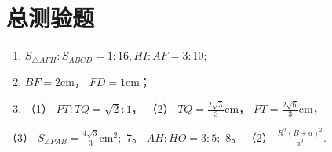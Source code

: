 \section{总测验题}

\begin{enumerate}
\item
  \(S_{\triangle AFH}: S_{ABCD} = 1:16, HI: AF = 3:10;\)
\item
  \(BF = 2\mathrm{cm}\)， \(FD = 1\mathrm{cm}\)；
\item
  （1） \(PT: TQ = \sqrt{2}: 1\)， （2）
  \(TQ = \frac{2\sqrt{3}}{3}\mathrm{cm}\)，
  \(PT = \frac{2\sqrt{6}}{3}\mathrm{cm}\)，
\end{enumerate}

（3） \(S_{\angle PAB} = \frac{4\sqrt{3}}{3}\mathrm{cm}^2;\) 7。
\(AH:HO = 3:5;\) 8。 （2） \(\frac{R^2(B + a)^2}{a^2}.\)
